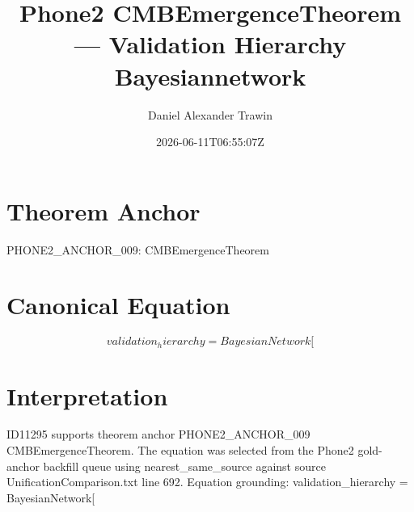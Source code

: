 \documentclass[11pt]{article}
\title{Phone2 CMBEmergenceTheorem — Validation Hierarchy Bayesiannetwork}
\author{Daniel Alexander Trawin}
\date{2026-06-11T06:55:07Z}
\begin{document}
\maketitle
\section*{Theorem Anchor}
PHONE2_ANCHOR_009: CMBEmergenceTheorem
\section*{Canonical Equation}
\[
validation_hierarchy = BayesianNetwork[
\]
\section*{Interpretation}
ID11295 supports theorem anchor PHONE2_ANCHOR_009 CMBEmergenceTheorem. The equation was selected from the Phone2 gold-anchor backfill queue using nearest_same_source against source UnificationComparison.txt line 692. Equation grounding: validation_hierarchy = BayesianNetwork[
\end{document}
